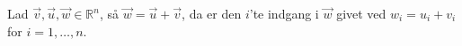 \begin{defn}
Lad $\vec{v}, \vec{u}, \vec{w} \in \mathds{R}^n$, så $\vec{w}=\vec{u}+\vec{v}$, da er den $i$'te indgang i $\vec{w}$ givet ved $w_i = u_i + v_i$ for $i=1, \dots ,n$. 
\label{def:add_vek}
\end{defn}
